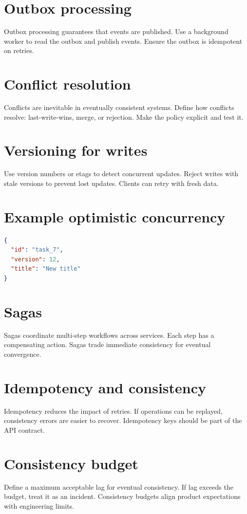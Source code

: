 \section{Outbox processing}
Outbox processing guarantees that events are published.
Use a background worker to read the outbox and publish events.
Ensure the outbox is idempotent on retries.

\section{Conflict resolution}
Conflicts are inevitable in eventually consistent systems.
Define how conflicts resolve: last-write-wins, merge, or rejection.
Make the policy explicit and test it.

\section{Versioning for writes}
Use version numbers or etags to detect concurrent updates.
Reject writes with stale versions to prevent lost updates.
Clients can retry with fresh data.

\section{Example optimistic concurrency}
\begin{lstlisting}[language=JSON]
{
  "id": "task_7",
  "version": 12,
  "title": "New title"
}
\end{lstlisting}

\section{Sagas}
Sagas coordinate multi-step workflows across services.
Each step has a compensating action.
Sagas trade immediate consistency for eventual convergence.

\section{Idempotency and consistency}
Idempotency reduces the impact of retries.
If operations can be replayed, consistency errors are easier to recover.
Idempotency keys should be part of the API contract.

\section{Consistency budget}
Define a maximum acceptable lag for eventual consistency.
If lag exceeds the budget, treat it as an incident.
Consistency budgets align product expectations with engineering limits.

